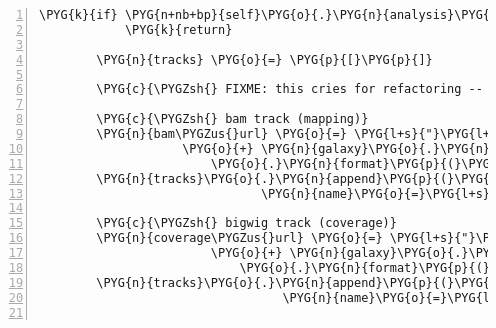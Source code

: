 \begin{Verbatim}[commandchars=\\\{\},numbers=left,firstnumber=1,stepnumber=5]
        \PYG{k}{if} \PYG{n+nb+bp}{self}\PYG{o}{.}\PYG{n}{analysis}\PYG{o}{.}\PYG{n}{galaxy\PYGZus{}hg\PYGZus{}text}\PYG{p}{:}
            \PYG{k}{return}

        \PYG{n}{tracks} \PYG{o}{=} \PYG{p}{[}\PYG{p}{]}

        \PYG{c}{\PYGZsh{} FIXME: this cries for refactoring -- with logging!}

        \PYG{c}{\PYGZsh{} bam track (mapping)}
        \PYG{n}{bam\PYGZus{}url} \PYG{o}{=} \PYG{l+s}{"}\PYG{l+s}{https://}\PYG{l+s}{"} \PYG{o}{+} \PYG{n}{galaxy}\PYG{o}{.}\PYG{n}{hostname} \PYGZbs{}
                    \PYG{o}{+} \PYG{n}{galaxy}\PYG{o}{.}\PYG{n}{ucsc\PYGZus{}bam\PYGZus{}path\PYGZus{}template} \PYGZbs{}
                        \PYG{o}{.}\PYG{n}{format}\PYG{p}{(}\PYG{n}{dataset}\PYG{o}{=}\PYG{n+nb+bp}{self}\PYG{o}{.}\PYG{n}{analysis}\PYG{o}{.}\PYG{n}{galaxy\PYGZus{}bam}\PYG{o}{.}\PYG{n}{id}\PYG{p}{)}
        \PYG{n}{tracks}\PYG{o}{.}\PYG{n}{append}\PYG{p}{(}\PYG{n}{BAMTrack}\PYG{p}{(}\PYG{n}{url}\PYG{o}{=}\PYG{n}{bam\PYGZus{}url}\PYG{p}{,}
                               \PYG{n}{name}\PYG{o}{=}\PYG{l+s}{"}\PYG{l+s}{RNA-Seqlyze \textbar{} }\PYG{l+s+si}{\PYGZpc{}s}\PYG{l+s}{"} \PYG{o}{\PYGZpc{}} \PYG{n+nb+bp}{self}\PYG{o}{.}\PYG{n}{bam\PYGZus{}name}\PYG{p}{)}\PYG{p}{)}

        \PYG{c}{\PYGZsh{} bigwig track (coverage)}
        \PYG{n}{coverage\PYGZus{}url} \PYG{o}{=} \PYG{l+s}{"}\PYG{l+s}{https://}\PYG{l+s}{"} \PYG{o}{+} \PYG{n}{galaxy}\PYG{o}{.}\PYG{n}{hostname} \PYGZbs{}
                        \PYG{o}{+} \PYG{n}{galaxy}\PYG{o}{.}\PYG{n}{dataset\PYGZus{}display\PYGZus{}url\PYGZus{}template} \PYGZbs{}
                            \PYG{o}{.}\PYG{n}{format}\PYG{p}{(}\PYG{n}{dataset}\PYG{o}{=}\PYG{n+nb+bp}{self}\PYG{o}{.}\PYG{n}{analysis}\PYG{o}{.}\PYG{n}{galaxy\PYGZus{}coverage}\PYG{o}{.}\PYG{n}{id}\PYG{p}{)}
        \PYG{n}{tracks}\PYG{o}{.}\PYG{n}{append}\PYG{p}{(}\PYG{n}{BigWigTrack}\PYG{p}{(}\PYG{n}{url}\PYG{o}{=}\PYG{n}{coverage\PYGZus{}url}\PYG{p}{,}
                                  \PYG{n}{name}\PYG{o}{=}\PYG{l+s}{"}\PYG{l+s}{RNA-Seqlyze \textbar{} }\PYG{l+s+si}{\PYGZpc{}s}\PYG{l+s}{"} \PYG{o}{\PYGZpc{}} \PYG{n+nb+bp}{self}\PYG{o}{.}\PYG{n}{coverage\PYGZus{}name}\PYG{p}{)}\PYG{p}{)}


\end{Verbatim}
